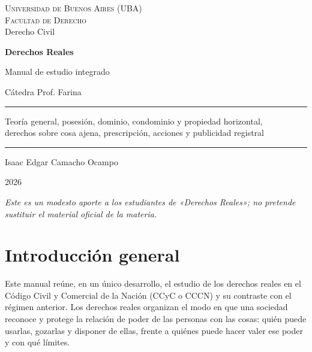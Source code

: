 \documentclass[12pt,oneside]{book}
\newcommand{\universidad}{Universidad de Buenos Aires (UBA)}
\newcommand{\facultad}{Facultad de Derecho}
\newcommand{\carrera}{Derecho Civil}
\newcommand{\materia}{Derechos Reales}
\newcommand{\subtitulo}{Manual de estudio integrado}
\newcommand{\catedra}{Cátedra Prof. Farina}
\newcommand{\autor}{Isaac Edgar Camacho Ocampo}
\newcommand{\anio}{2026}
\begin{document}
\frontmatter

\begin{titlepage}
\thispagestyle{empty}
\begin{center}
\vspace*{1cm}
{\large \textsc{\universidad}}\\[0.2cm]
{\large \textsc{\facultad}}\\[0.2cm]
{\large \carrera}

\vspace{3cm}
{\Huge \textbf{\materia}}

\vspace{1cm}
{\LARGE \subtitulo}

\vspace{0.4cm}
{\normalsize \catedra}

\vspace{1.2cm}
\rule{0.70\textwidth}{0.5pt}

\vspace{0.4cm}
{\large Teoría general, posesión, dominio, condominio y propiedad horizontal,\\ derechos sobre cosa ajena, prescripción, acciones y publicidad registral}

\vspace{0.4cm}
\rule{0.70\textwidth}{0.5pt}

\vfill
{\large \autor}

\vspace{0.3cm}
{\large \anio}
\end{center}
\vfill
\begin{flushleft}
\small\textit{Este es un modesto aporte a los estudiantes de «Derechos Reales»; no pretende sustituir el material oficial de la materia.}
\end{flushleft}
\end{titlepage}

\tableofcontents

\mainmatter

\chapter*{Introducción general}

Este manual reúne, en un único desarrollo, el estudio de los derechos reales en el Código Civil y Comercial de la Nación (CCyC o CCCN) y su contraste con el régimen anterior. Los derechos reales organizan el modo en que una sociedad reconoce y protege la relación de poder de las personas con las cosas: quién puede usarlas, gozarlas y disponer de ellas, frente a quiénes puede hacer valer ese poder y con qué límites.
\end{document}
